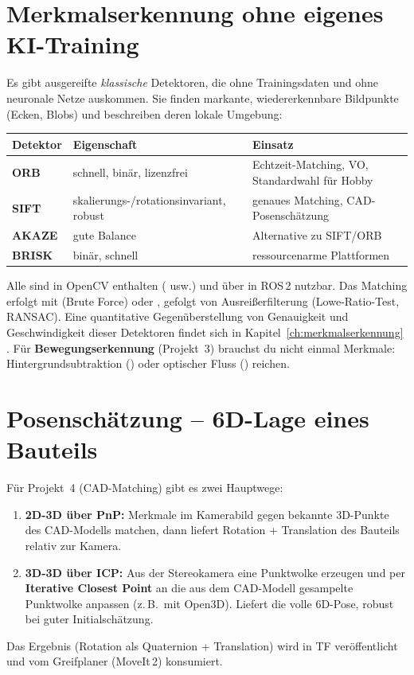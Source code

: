 \section{Merkmalserkennung ohne eigenes KI-Training}
Es gibt ausgereifte \emph{klassische} Detektoren, die ohne Trainingsdaten und
ohne neuronale Netze auskommen. Sie finden markante, wiedererkennbare
Bildpunkte (Ecken, Blobs) und beschreiben deren lokale Umgebung:
\begin{longtable}{@{}p{2.4cm}p{4.5cm}p{8cm}@{}}
\toprule
\textbf{Detektor} & \textbf{Eigenschaft} & \textbf{Einsatz} \\
\midrule
\textbf{ORB}   & schnell, binär, lizenzfrei    & Echtzeit-Matching, VO, Standardwahl für Hobby \\
\textbf{SIFT}  & skalierungs-/rotationsinvariant, robust & genaues Matching, CAD-Posenschätzung \\
\textbf{AKAZE} & gute Balance                  & Alternative zu SIFT/ORB \\
\textbf{BRISK} & binär, schnell                & ressourcenarme Plattformen \\
\bottomrule
\end{longtable}
\noindent Alle sind in OpenCV enthalten ( usw.) und über
 in ROS\,2 nutzbar. Das Matching erfolgt mit 
(Brute Force) oder , gefolgt von Ausreißerfilterung
(Lowe-Ratio-Test, RANSAC). Eine quantitative Gegenüberstellung von Genauigkeit
und Geschwindigkeit dieser Detektoren findet sich in
Kapitel~\ref{ch:merkmalserkennung} \cite{tareen2018comparative}. Für \textbf{Bewegungserkennung} (Projekt~3) brauchst
du nicht einmal Merkmale: Hintergrundsubtraktion
() oder optischer Fluss
() reichen.

\section{Posenschätzung -- 6D-Lage eines Bauteils}
Für Projekt~4 (CAD-Matching) gibt es zwei Hauptwege:
\begin{enumerate}
\item \textbf{2D-3D über PnP:} Merkmale im Kamerabild gegen bekannte 3D-Punkte
  des CAD-Modells matchen, dann  liefert Rotation +
  Translation des Bauteils relativ zur Kamera.
\item \textbf{3D-3D über ICP:} Aus der Stereokamera eine Punktwolke erzeugen und
  per \textbf{Iterative Closest Point} an die aus dem CAD-Modell gesampelte
  Punktwolke anpassen (z.\,B.\ mit Open3D). Liefert die volle 6D-Pose, robust
  bei guter Initialschätzung.
\end{enumerate}
Das Ergebnis (Rotation als Quaternion + Translation) wird in TF veröffentlicht
und vom Greifplaner (MoveIt\,2) konsumiert.
